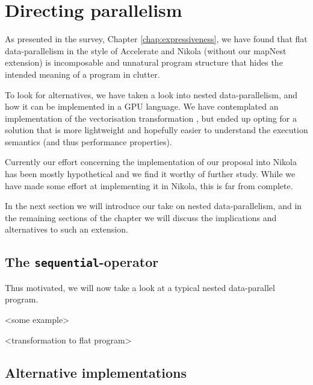 \chapter{Directing parallelism}
\label{chap:directing-parallelism}


As presented in the survey, Chapter \ref{chap:expressiveness}, we have
found that flat data-parallelism in the style of Accelerate and Nikola
(without our mapNest extension) is incomposable and unnatural program
structure that hides the intended meaning of a program in clutter.

To look for alternatives, we have taken a look into nested
data-parallelism, and how it can be implemented in a GPU language. We
have contemplated an implementation of the vectorisation
transformation , but ended up opting for a solution that is
more lightweight and hopefully easier to understand the execution
semantics (and thus performance properties).

Currently our effort concerning the implementation of our proposal
into Nikola has been mostly hypothetical and we find it worthy of
further study.  While we have made some effort at implementing it in
Nikola, this is far from complete.

In the next section we will introduce our take on nested
data-parallelism, and in the remaining sections of the chapter we will
discuss the implications and alternatives to such an extension.


\section{The \texttt{sequential}-operator}
Thus motivated, we will now take a look at a typical nested
data-parallel program.

<some example>

<transformation to flat program>


\section{Alternative implementations}

